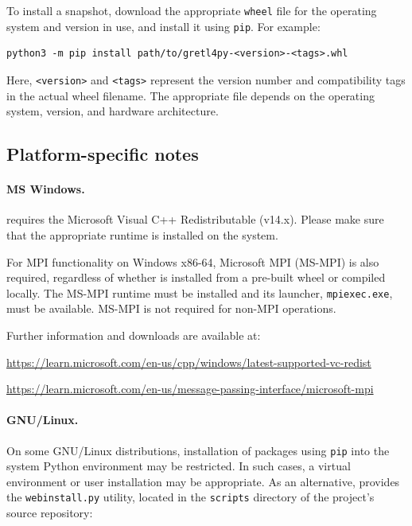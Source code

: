 To install a snapshot, download the appropriate \texttt{wheel} file
for the operating system and \python version in use, and install it
using \texttt{pip}. For example:

\begin{verbatim}
python3 -m pip install path/to/gretl4py-<version>-<tags>.whl
\end{verbatim}
Here, \texttt{<version>} and \texttt{<tags>} represent the version
number and compatibility tags in the actual wheel filename.
The appropriate file depends on the operating system, \python
version, and hardware architecture.


\subsection{Platform-specific notes}
\paragraph{MS Windows.}
\gretlpy requires the Microsoft Visual C++ Redistributable
(v14.x). Please make sure that the appropriate runtime is
installed on the system.

For MPI functionality on Windows x86-64, Microsoft MPI
(MS-MPI) is also required, regardless of whether \gretlpy
is installed from a pre-built wheel or compiled locally.
The MS-MPI runtime must be installed and its launcher,
\texttt{mpiexec.exe}, must be available.
MS-MPI is not required for non-MPI operations.

Further information and downloads are available at:

\begin{center}
	\url{https://learn.microsoft.com/en-us/cpp/windows/latest-supported-vc-redist}
\end{center}

\begin{center}
	\url{https://learn.microsoft.com/en-us/message-passing-interface/microsoft-mpi}
\end{center}


\paragraph{GNU/Linux.}
On some GNU/Linux distributions, installation of packages using
\texttt{pip} into the system Python environment may be restricted.
In such cases, a virtual environment or user installation may be
appropriate. As an alternative, \gretlpy provides the
\texttt{webinstall.py} utility, located in the \texttt{scripts} directory of the
project's source repository:

